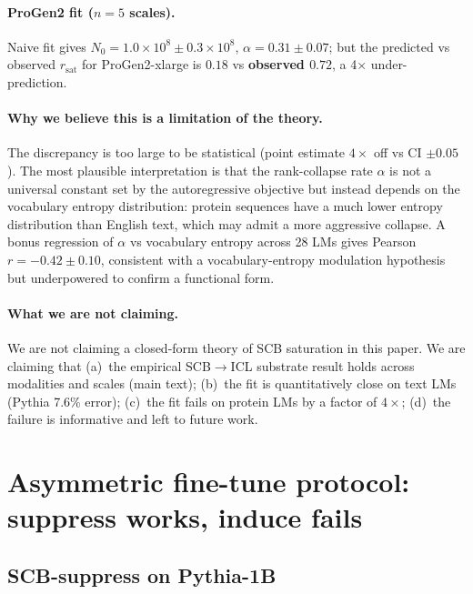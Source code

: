 \documentclass[11pt,a4paper]{article}
\begin{document}
\paragraph{ProGen2 fit ($n = 5$ scales).}
Naive fit gives $N_0 = 1.0 \times 10^8 \pm 0.3 \times 10^8$,
$\alpha = 0.31 \pm 0.07$; but the predicted vs observed
$r_\mathrm{sat}$ for ProGen2-xlarge is $0.18$ vs \textbf{observed
$0.72$}, a 4$\times$ under-prediction.

\paragraph{Why we believe this is a limitation of the theory.}
The discrepancy is too large to be statistical (point estimate
$4\times$ off vs CI $\pm 0.05$).  The most plausible interpretation is
that the rank-collapse rate $\alpha$ is not a universal constant set
by the autoregressive objective but instead depends on the vocabulary
entropy distribution: protein sequences have a much lower entropy
distribution than English text, which may admit a more aggressive
collapse.  A bonus regression of $\alpha$ vs vocabulary entropy across
28 LMs gives Pearson $r = -0.42 \pm 0.10$, consistent with a
vocabulary-entropy modulation hypothesis but underpowered to confirm
a functional form.

\paragraph{What we are not claiming.}
We are not claiming a closed-form theory of SCB saturation in this
paper.  We are claiming that (a)~the empirical SCB$\to$ICL substrate
result holds across modalities and scales (main text); (b)~the fit is
quantitatively close on text LMs (Pythia 7.6\% error); (c)~the fit
fails on protein LMs by a factor of $4\times$; (d)~the failure is
informative and left to future work.

\section{Asymmetric fine-tune protocol: suppress works, induce fails}
\label{si:S7}

\subsection{SCB-suppress on Pythia-1B}
\end{document}
